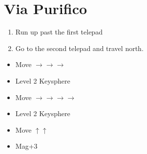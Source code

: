 \chapter{Via Purifico}

\begin{enumerate}
    \item Run up past the first telepad
    \item Go to the second telepad and travel north.
\end{enumerate}
\bothvfill
\winvfill
\begin{spheregrid}
    \begin{itemize}
        \auronf
        \begin{itemize}
            \item Move $\rightarrow\rightarrow\rightarrow$
            \item Level 2 Keysphere
            \item Move $\rightarrow\rightarrow\rightarrow\rightarrow$
            \item Level 2 Keysphere
            \item Move $\uparrow\uparrow$
            \item Mag+3
        \end{itemize}

\end{itemize}
\end{spheregrid}
